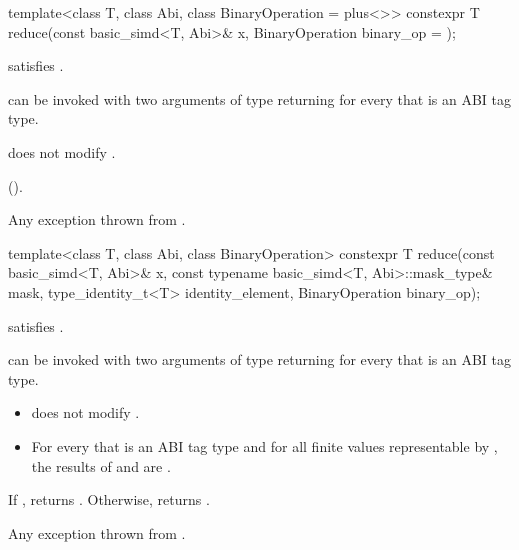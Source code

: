 
\begin{itemdecl}
template<class T, class Abi, class BinaryOperation = plus<>>
  constexpr T reduce(const basic_simd<T, Abi>& x, BinaryOperation binary_op = {});
\end{itemdecl}

\begin{itemdescr}
  \pnum\constraints
   satisfies .

  \pnum\mandates
   can be invoked with two arguments of type
   returning  for every
   that is an ABI tag type.

  \pnum\expects
   does not modify .

  \pnum\returns
   \foralli{} ().

  \pnum\throws
  Any exception thrown from .
\end{itemdescr}

\begin{itemdecl}
template<class T, class Abi, class BinaryOperation>
  constexpr T reduce(const basic_simd<T, Abi>& x, const typename basic_simd<T, Abi>::mask_type& mask,
                     type_identity_t<T> identity_element, BinaryOperation binary_op);
\end{itemdecl}

\begin{itemdescr}
  \pnum\constraints
   satisfies .

  \pnum\mandates
   can be invoked with two arguments of type  returning  for every  that is an ABI tag type.

  \pnum\expects
  \begin{itemize}
    \item {} does not modify .

    \item For every  that is an ABI tag type and for all finite
      values  representable by , the results of
       and  are .
  \end{itemize}

  \pnum\returns
  If , returns .
  Otherwise, returns  \forallmaskedi.

  \pnum\throws
  Any exception thrown from .
\end{itemdescr}

